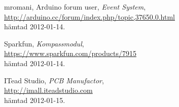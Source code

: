 \begin{thebibliography}{9}
mromani, Arduino forum user,
\emph{Event System}, \\
\url{http://arduino.cc/forum/index.php/topic,37650.0.html} \\
hämtad 2012-01-14.

Sparkfun,
\emph{Kompassmodul}, \\
\url{https://www.sparkfun.com/products/7915} \\
hämtad 2012-01-14.

ITead Studio,
\emph{PCB Manufactor}, \\
\url{http://imall.iteadstudio.com} \\
hämtad 2012-01-15.
\end{thebibliography}

